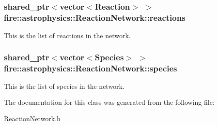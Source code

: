 \subsubsection[{\texorpdfstring{reactions}{reactions}}]{\setlength{\rightskip}{0pt plus 5cm}shared\+\_\+ptr$<$vector$<${\bf Reaction}$>$ $>$ fire\+::astrophysics\+::\+Reaction\+Network\+::reactions}\hypertarget{a00023_a32964b6f6a9cb312e722c1478167b7f0}{}\label{a00023_a32964b6f6a9cb312e722c1478167b7f0}
This is the list of reactions in the network. 
\subsubsection[{\texorpdfstring{species}{species}}]{\setlength{\rightskip}{0pt plus 5cm}shared\+\_\+ptr$<$vector$<${\bf Species}$>$ $>$ fire\+::astrophysics\+::\+Reaction\+Network\+::species}\hypertarget{a00023_ac3811889f4866a29a49ce3a8d0e80cad}{}\label{a00023_ac3811889f4866a29a49ce3a8d0e80cad}
This is the list of species in the network. 

The documentation for this class was generated from the following file\+:\begin{DoxyCompactItemize}
\item 
Reaction\+Network.\+h\end{DoxyCompactItemize}
